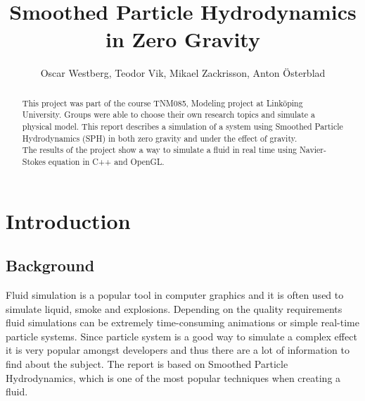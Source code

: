 \documentclass[a4paper,12pt,twoside]{report}
\begin{document}
\pagestyle{plain}


\title{Smoothed Particle Hydrodynamics in Zero Gravity}
\author{Oscar Westberg, Teodor Vik, Mikael Zackrisson, Anton Österblad}
\maketitle

\thispagestyle{empty}
\newpage{}

\setcounter{page}{2}
\begin{abstract}
This project was part of the course TNM085, Modeling project at Linköping University. Groups were able to choose their own research topics and simulate a physical model. This report describes a simulation of a system using Smoothed Particle Hydrodynamics (SPH) in both zero gravity and under the effect of gravity. \\

\noindent The results of the project show a way to simulate a fluid in real time using Navier-Stokes equation in C++ and OpenGL.
\vfill
\end{abstract}
\newpage{}

\tableofcontents  %
\listoffigures    %



\chapter{Introduction}

\section{Background}
Fluid simulation is a popular tool in computer graphics and it is often used to simulate liquid, smoke and explosions. Depending on the quality requirements fluid simulations can be extremely time-consuming animations or simple real-time particle systems. Since particle system is a good way to simulate a complex effect it is very popular amongst developers and thus there are a lot of information to find about the subject. The report is based on Smoothed Particle Hydrodynamics, which is one of the most popular techniques when creating a fluid.
\end{document}
